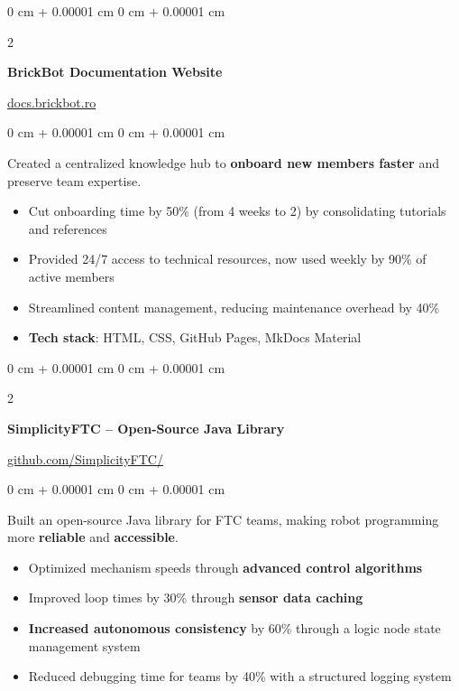 \documentclass[10pt, letterpaper]{article}
\newenvironment{highlights}{
    \begin{itemize}[
        topsep=0.10 cm,
        parsep=0.10 cm,
        partopsep=0pt,
        itemsep=0pt,
        leftmargin=0 cm + 10pt
    ]
}{
    \end{itemize}
} %
\newenvironment{onecolentry}{
    \begin{adjustwidth}{
        0 cm + 0.00001 cm
    }{
        0 cm + 0.00001 cm
    }
}{
    \end{adjustwidth}
} %
\newenvironment{twocolentry}[2][]{
    \onecolentry
    \def\secondColumn{#2}
    \setcolumnwidth{\fill, 4.5 cm}
    \begin{paracol}{2}
}{
    \switchcolumn \raggedleft \secondColumn
    \end{paracol}
    \endonecolentry
} %
\begin{document}
\vspace{0.2 cm}

\begin{twocolentry}{
    \href{https://docs.brickbot.ro}{docs.brickbot.ro}
}
    \textbf{BrickBot Documentation Website}
\end{twocolentry}
\vspace{0.10 cm}
\begin{onecolentry}
    Created a centralized knowledge hub to \textbf{onboard new members faster} and preserve team expertise.
    \begin{highlights}
        \item Cut onboarding time by 50\% (from 4 weeks to 2) by consolidating tutorials and references
        \item Provided 24/7 access to technical resources, now used weekly by 90\% of active members
        \item Streamlined content management, reducing maintenance overhead by 40\%
        \item \textbf{Tech stack}: HTML, CSS, GitHub Pages, MkDocs Material
    \end{highlights}
\end{onecolentry}

\vspace{0.2 cm}

\begin{twocolentry}{
    \href{https://github.com/SimplicityFTC/SimplicityFTC-Quickstart}{github.com/SimplicityFTC/}
}
    \textbf{SimplicityFTC --  Open-Source Java Library}
\end{twocolentry}
\vspace{0.10 cm}
\begin{onecolentry}
    Built an open-source Java library for FTC teams, making robot programming more \textbf{reliable} and \textbf{accessible}.
   \begin{highlights}
        \item Optimized mechanism speeds through \textbf{advanced control algorithms}
        \item Improved loop times by 30\% through \textbf{sensor data caching}
        \item \textbf{Increased autonomous consistency} by 60\% through a logic node state management system
        \item Reduced debugging time for teams by 40\% with a structured logging system
    \end{highlights}
\end{onecolentry}
\end{document}
